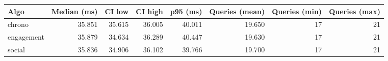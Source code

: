 \begin{tabular}{lrrrrrrr}
\toprule
Algo & Median (ms) & CI low & CI high & p95 (ms) & Queries (mean) & Queries (min) & Queries (max) \\
\midrule
chrono & 35.851 & 35.615 & 36.005 & 40.011 & 19.650 & 17 & 21 \\
engagement & 35.879 & 34.634 & 36.289 & 40.447 & 19.630 & 17 & 21 \\
social & 35.836 & 34.906 & 36.102 & 39.766 & 19.700 & 17 & 21 \\
\bottomrule
\end{tabular}
